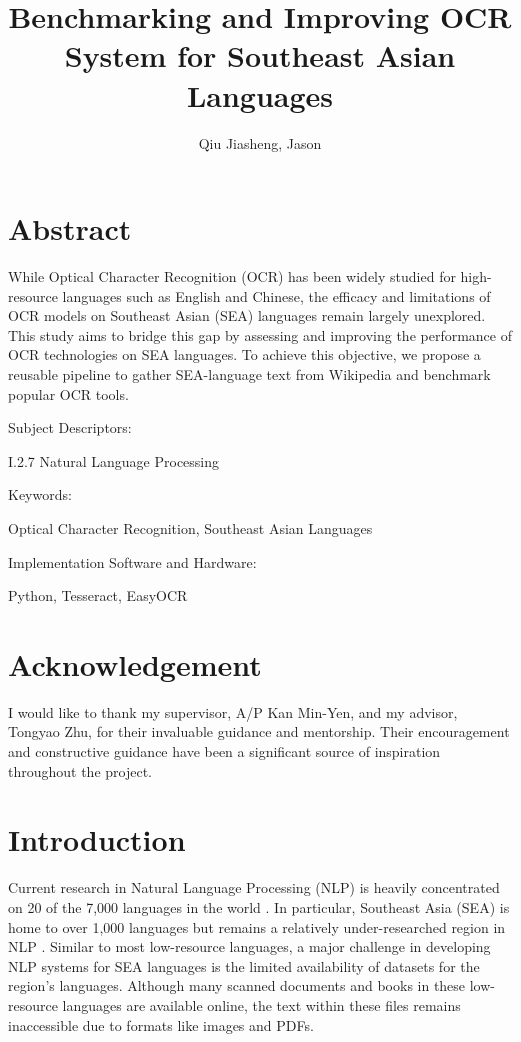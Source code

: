 \documentclass[12pt,oneside]{memoir}
\title{Benchmarking and Improving OCR System for Southeast Asian Languages}
\author{Qiu Jiasheng, Jason}
\begin{document}
\frontmatter

\pagestyle{plain}

\makecover

\setcounter{page}{1}

\maketitle

\chapter{Abstract}
While Optical Character Recognition (OCR) has been widely studied for high-resource languages such as English and Chinese, the efficacy and limitations of OCR models on Southeast Asian (SEA) languages remain largely unexplored.
This study aims to bridge this gap by assessing and improving the performance of OCR technologies on SEA languages.
To achieve this objective, we propose a reusable pipeline to gather SEA-language text from Wikipedia and benchmark popular OCR tools.

\vspace{20pt}
Subject Descriptors:
\begin{adjustwidth}{0.7in}{}
    I.2.7 Natural Language Processing
\end{adjustwidth}

Keywords:
\begin{adjustwidth}{0.7in}{}
    Optical Character Recognition, Southeast Asian Languages
\end{adjustwidth}

Implementation Software and Hardware:
\begin{adjustwidth}{0.7in}{}
    Python, Tesseract, EasyOCR
\end{adjustwidth}

\chapter{Acknowledgement}
I would like to thank my supervisor, A/P Kan Min-Yen, and my advisor, Tongyao Zhu, for their invaluable guidance and mentorship. Their encouragement and constructive guidance have been a significant source of inspiration throughout the project.

\listoffigures
\listoftables
\tableofcontents

\mainmatter

\chapter{Introduction}
Current research in Natural Language Processing (NLP) is heavily concentrated on 20 of the 7,000 languages in the world \parencite{magueresse-etal-2020}.
In particular, Southeast Asia (SEA) is home to over 1,000 languages but remains a relatively under-researched region in NLP \parencite{aji-etal-2023}.
Similar to most low-resource languages, a major challenge in developing NLP systems for SEA languages is the limited availability of datasets for the region’s languages.
Although many scanned documents and books in these low-resource languages are available online, the text within these files remains inaccessible due to formats like images and PDFs.
\end{document}
